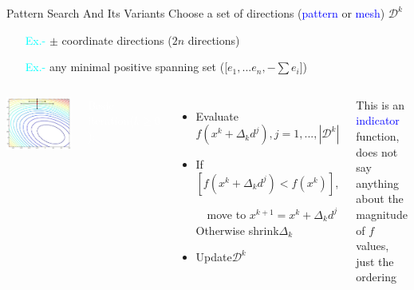 \documentclass[handout,aspectratio=54]{beamer}
\numberwithin{theorem}{section}
\begin{document}
\begin{frame}{Pattern Search And Its Variants}\footnotesize
Choose a set of directions (\textcolor{blue}{pattern} or \textcolor{blue}{mesh}) $\mathcal{D}^k$

\begin{itemize}
\item[\textcolor{cyan}{Ex.-}] $\pm$ coordinate directions ($2n$ directions)
\item[\textcolor{cyan}{Ex.-}] any minimal positive spanning set ([$e_1,...e_n,-\sum e_i$])
\end{itemize}

\begin{columns}
\includegraphics[width=\textwidth]{fig/17-2.jpg}

\colorbox[rgb]{0.5,0.6,0.7}{\textcolor{white}{Basic iteration($k\ge0$):}}
\begin{itemize}\scriptsize
\item Evaluate $f(x^k+\Delta_kd^j),j=1,...,|\mathcal{D}^k|
$\item If $[f(x^k+\Delta_kd^j)<f(x^k)]$, 

$\quad$move to $x^{k+1}=x^k+\Delta_kd^j$\\

Otherwise shrink$\Delta_k$
\item Update$\mathcal{D}^k$
\end{itemize}
This is an \textcolor{blue}{indicator} function, does not say anything about the magnitude of $f$ values, just the ordering
\end{columns}

\vspace{1.2cm}

\tiny
{}

\end{frame}
\end{document}
